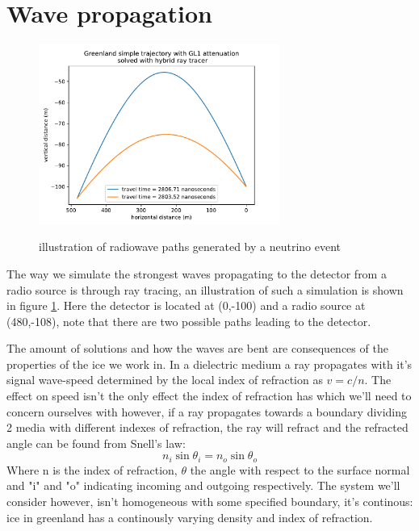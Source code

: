 \documentclass[11pt,a4paper,faculty=we,language=en,doctype=report]{cls/ugent-doc}
\begin{document}
\section{Wave propagation}
\begin{figure}[h!]
	\centering
	\includegraphics[width=0.7\textwidth]{path_illustration.pdf}
	\label{fig:PathIllu}
	\caption{illustration of radiowave paths generated by a neutrino event}
\end{figure}
The way we simulate the strongest waves propagating to the detector from a
radio source is through ray tracing, an illustration of such a simulation is
shown in figure \ref{fig:PathIllu}.  Here the detector is located at (0,-100)
and a radio source at (480,-108), note that there are two possible paths
leading to the detector.

The amount of solutions and how the waves are bent are consequences of the
properties of the ice we work in.  In a dielectric medium a ray propagates with
it's signal wave-speed determined by the local index of refraction as $v =
c/n$.   The effect on speed isn't the only effect the index of refraction has
which we'll need to concern ourselves with however, if a ray propagates towards
a boundary dividing 2 media with different indexes of refraction, the ray will
refract and the refracted angle can be found from Snell's law:
\begin{equation}
	n_i\sin{\theta_i} = n_o\sin{\theta_o}
\end{equation}
Where n is the index of refraction, $\theta$ the angle with respect to the
surface normal and "i" and "o" indicating incoming and outgoing respectively.
The system we'll consider however, isn't homogeneous with some specified
boundary, it's continous: ice in greenland has a continously varying density and
index of refraction.
\end{document}
